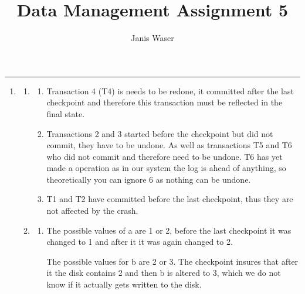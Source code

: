 \documentclass[12pt]{extarticle}
\title{Data Management Assignment 5}
\author{Janis Waser}
\begin{document}
\maketitle \vspace{-10mm}
\rule{\linewidth}{0.4pt}


\begin{flushleft}
\begin{enumerate}[label=\textbf{\Alph*.}]

\item 
\begin{enumerate}[label=\arabic*.]
\item \begin{enumerate}[label=(\alph*)]
\item Transaction 4 (T4) is needs to be redone, it committed after the last checkpoint and therefore this transaction must be reflected in the final state.
\item Transactions 2 and 3 started before the checkpoint but did not commit, they have to be undone. As well as transactions T5 and T6 who did not commit and therefore need to be undone. T6 has yet made a operation as in our system the log is ahead of anything, so theoretically you can ignore 6 as nothing can be undone.
\item T1 and T2 have committed before the last checkpoint, thus they are not affected by the crash.
\end{enumerate}
 \item \begin{enumerate}[label=(\alph*)] 
\item The possible values of a are 1 or 2, before the last checkpoint it was changed to 1 and after it it was again changed to 2. 

The possible values for b are 2 or 3. The checkpoint insures that after it the disk contains 2 and then b is altered to 3, which we do not know if it actually gets written to the disk. 


\end{enumerate}
\end{enumerate}
\end{enumerate}
\end{flushleft}
\end{document}
